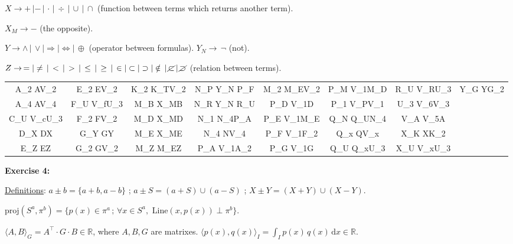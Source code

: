 \documentclass[11pt,a4paper]{article}
\begin{document}
		$X \rightarrow +\,|-\,|\,\cdot\,|\,\div\,|\,\cup\,|\,\cap$ (function between terms which returns another term).

		$X_M \rightarrow -$ (the opposite).

		$Y \rightarrow \wedge\,|\,\vee|\Rightarrow|\Leftrightarrow|\,\oplus$ (operator between formulas). $Y_N \rightarrow\,\neg$ (not).

		$Z \rightarrow\, =|\ne\,|\,<\,|\,>\,|\,\le\,|\,\ge\,|\,\in|\subset|\supset|\notin\,|\,\cancel{\subset}\,|\,\cancel{\supset}$ (relation between terms).

		\vspace{3mm}

		\begin{tabular}{C|C|C|C|C|C|C|C}
		A_2 \rightarrow AV_2 &   E_2 \rightarrow EV_2 &   K_2 \rightarrow K_TV_2 & N_P \rightarrow Y_N P_F &  M_2 \rightarrow M_EV_2 & P_M \rightarrow V_1M_D &  R_U \rightarrow V_RU_3 & Y_G \rightarrow YG_2 \\
		A_4 \rightarrow AV_4 &	 F_U \rightarrow V_fU_3 & M_B \rightarrow X_MB & 	N_R \rightarrow Y_N R_U & P_D \rightarrow V_1D   &	P_1 \rightarrow V_PV_1 & U_3 \rightarrow V_6V_3 \\
		C_U \rightarrow V_cU_3 & F_2 \rightarrow FV_2 &   M_D \rightarrow X_MD & 	N_1 \rightarrow N_4P_A  & P_E \rightarrow V_1M_E &	Q_N \rightarrow Q_UN_4 & V_A \rightarrow V_5A \\
		D_X \rightarrow DX &     G_Y \rightarrow GY   &   M_E \rightarrow X_ME & 	N_4 \rightarrow NV_4    & P_F \rightarrow V_1F_2 & Q_x \rightarrow QV_x   &  X_K \rightarrow XK_2 \\
		E_Z \rightarrow EZ &     G_2 \rightarrow GV_2 &   M_Z \rightarrow M_EZ & 	P_A \rightarrow V_1A_2  & P_G \rightarrow V_1G   & Q_U \rightarrow Q_xU_3 &  X_U \rightarrow V_xU_3
		\end{tabular}

		\vspace{3mm}
		\Large
		\textbf{Exercise 4:}
		\normalsize
		\vspace{3mm}

		\underline{Definitions}: $a \pm b = \{ a + b, a - b \}$ ; $a \pm S = (a + S) \cup (a - S)$ ; $X \pm Y = (X + Y) \cup (X - Y)$.

		$\text{proj}(S^a, \pi^b) = \{ p(x) \in \pi^a\,;\,\forall x \in S^a, \text{ Line}(x, p(x)) \perp \pi^b \}$.

		$\langle A, B\rangle_G = A^\top \cdot G \cdot B \in \mathbb{R}$, where $A,B,G$ are matrixes. $\langle p(x), q(x)\rangle_I = \int_I p(x)\,q(x)\,\mathrm{d}x \in \mathbb{R}$.
\end{document}
